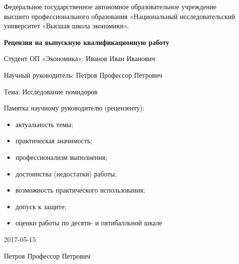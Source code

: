 \documentclass[a4paper, 12pt]{article}
\providecommand{\tightlist}{%
  \setlength{\itemsep}{0pt}\setlength{\parskip}{0pt}}
\begin{document}
\begin{center}
{\small Федеральное государственное автономное образовательное учреждение\\ 
высшего профессионального образования «Национальный исследовательский\\ 
университет «Высшая школа экономики».}
\end{center}

\vspace{0.4cm}

\begin{center}
\textbf{Рецензия на выпускную квалификационную работу}
\end{center}

\vspace{0.4cm}

Студент ОП «Экономика»: Иванов Иван Иванович

\vspace{0.4cm}

Научный руководитель: Петров Профессор Петрович

\vspace{0.4cm}

Тема: Исследование помидоров

\vspace{1cm}

Памятка научному руководителю (рецензенту):

\begin{itemize}
\tightlist
\item
  актуальность темы;
\item
  практическая значимость;
\item
  профессионализм выполнения;
\item
  достоинства (недостатки) работы;
\item
  возможность практического использования;
\item
  допуск к защите;
\item
  оценки работы по десяти- и пятибалльной шкале
\end{itemize}

\vspace{1cm}

2017-05-15

Петров Профессор Петрович
\end{document}
